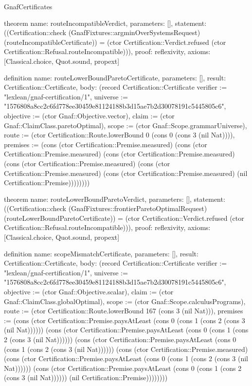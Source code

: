 \begin{lexlean}{GnafCertificates}
\begin{semanticmodule}
theorem{
  name: routeIncompatibleVerdict,
  parameters: [],
  statement: ((Certification::check (GnafFixtures::argminOverSystemsRequest) (routeIncompatibleCertificate)) = (ctor Certification::Verdict.refused (ctor Certification::Refusal.routeIncompatible))),
  proof: reflexivity{},
  axioms: [Classical.choice, Quot.sound, propext]
}

definition{
  name: routeLowerBoundParetoCertificate,
  parameters: [],
  result: Certification::Certificate,
  body: (record Certification::Certificate {verifier := "lexlean/gnaf-certification/1", universe := "1576808a8cc2c6fd778ee30459e81124188b3d15ae7b2d30078191c5445805c6", objective := (ctor Gnaf::Objective.vector), claim := (ctor Gnaf::ClaimClass.paretoOptimal), scope := (ctor Gnaf::Scope.grammarUniverse), route := (ctor Certification::Route.lowerBound 0 (cons 0 (cons 3 (nil Nat)))), premises := (cons (ctor Certification::Premise.measured) (cons (ctor Certification::Premise.measured) (cons (ctor Certification::Premise.measured) (cons (ctor Certification::Premise.measured) (cons (ctor Certification::Premise.measured) (cons (ctor Certification::Premise.measured) (nil Certification::Premise)))))))})
}

theorem{
  name: routeLowerBoundParetoVerdict,
  parameters: [],
  statement: ((Certification::check (GnafFixtures::frontierParetoOptimalRequest) (routeLowerBoundParetoCertificate)) = (ctor Certification::Verdict.refused (ctor Certification::Refusal.routeIncompatible))),
  proof: reflexivity{},
  axioms: [Classical.choice, Quot.sound, propext]
}

definition{
  name: scopeMismatchCertificate,
  parameters: [],
  result: Certification::Certificate,
  body: (record Certification::Certificate {verifier := "lexlean/gnaf-certification/1", universe := "1576808a8cc2c6fd778ee30459e81124188b3d15ae7b2d30078191c5445805c6", objective := (ctor Gnaf::Objective.scalar), claim := (ctor Gnaf::ClaimClass.globalOptimal), scope := (ctor Gnaf::Scope.calculusPrograms), route := (ctor Certification::Route.lowerBound 167 (cons 3 (nil Nat))), premises := (cons (ctor Certification::Premise.paysAtLeast (cons 0 (cons 1 (cons 2 (cons 3 (nil Nat)))))) (cons (ctor Certification::Premise.paysAtLeast (cons 0 (cons 1 (cons 2 (cons 3 (nil Nat)))))) (cons (ctor Certification::Premise.paysAtLeast (cons 0 (cons 1 (cons 2 (cons 3 (nil Nat)))))) (cons (ctor Certification::Premise.measured) (cons (ctor Certification::Premise.paysAtLeast (cons 0 (cons 1 (cons 2 (cons 3 (nil Nat)))))) (cons (ctor Certification::Premise.paysAtLeast (cons 0 (cons 1 (cons 2 (cons 3 (nil Nat)))))) (nil Certification::Premise)))))))})
}


\end{semanticmodule}
\end{lexlean}
